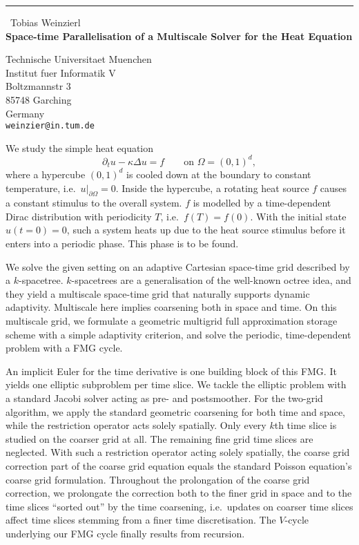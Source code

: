 \documentclass{report}
\begin{document}
\begin{center}
\rule{6in}{1pt} \
{\large Tobias Weinzierl \\
{\bf Space-time Parallelisation of a Multiscale Solver for the Heat Equation}}

Technische Universitaet Muenchen \\ Institut fuer Informatik V \\ Boltzmannstr 3 \\ 85748 Garching \\ Germany
\\
{\tt weinzier@in.tum.de}\end{center}

We study the simple heat equation
\[
\partial _t u - \kappa \Delta u = f \qquad \mbox{on } \Omega = (0,1)^d,
\]
where a hypercube $(0,1)^d$ is cooled down at the boundary to constant
temperature, i.e.~$u|_{\partial \Omega}=0$.
Inside the hypercube, a rotating heat source $f$ causes a constant stimulus to
the overall system.
$f$ is modelled by a time-dependent Dirac distribution with periodicity $T$,
i.e.~$f(T)=f(0)$.
With the initial state $u(t=0)=0$, such a system heats up due to the heat
source stimulus before it enters into a periodic phase.
This phase is to be found.

We solve the given setting on an adaptive Cartesian space-time grid
described by a $k$-spacetree.
$k$-spacetrees are a generalisation of the well-known octree idea, and they
yield a multiscale space-time grid that naturally supports dynamic adaptivity.
Multiscale here implies coarsening both in space and time.
On this multiscale grid, we formulate a geometric multigrid full approximation
storage scheme with a simple adaptivity criterion, and solve the periodic,
time-dependent problem with a FMG cycle.

An implicit Euler for the time derivative is one building block of this FMG.
It yields one elliptic subproblem per time slice.
We tackle the elliptic problem with a standard Jacobi solver acting as pre-
and postsmoother.
For the two-grid algorithm, we apply the standard geometric coarsening for both
time and space, while the restriction operator acts solely spatially.
Only every $k$th time slice is studied on the coarser grid at all.
The remaining fine grid time slices are neglected.
With such a restriction operator acting solely spatially,
the coarse grid correction part of the coarse grid equation equals the
standard Poisson equation's coarse grid formulation.
Throughout the prolongation of the coarse grid correction, we prolongate the
correction both to the finer grid in space and to the time slices ``sorted
out'' by the time coarsening, i.e.~updates on coarser time slices affect time
slices stemming from a finer time discretisation.
The $V$-cycle underlying our FMG cycle finally results from recursion.
\end{document}
